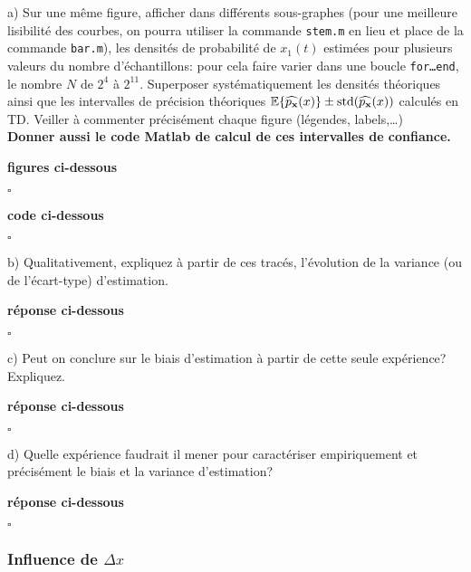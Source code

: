 \documentclass{article}
\newcommand{\debutrep}[1]{\color{blue}\begin{center} \hrulefill \textbf{ #1 } \hrulefill \end{center} }
\newcommand{\finrep}{\vspace*{5mm}\hfill $\square$\color{black}\vspace*{5mm}}
\begin{document}
\begin{list}{}{\setlength{\leftmargin}{6mm} \setlength{\labelwidth}{20mm} \setlength{\labelsep}{2mm} \setlength{\itemsep}{1mm} }

\item[a)] Sur une même figure, afficher dans différents sous-graphes (pour une meilleure lisibilité des courbes, on pourra utiliser la commande {\tt stem.m} en lieu et place de la commande {\tt bar.m}), les densités de probabilité de $x_1(t)$ estimées pour plusieurs valeurs du nombre d'échantillons: pour cela faire varier dans une boucle {\tt for\ldots end}, le nombre $N$ de $2^4$ à $2^{11}$. Superposer systématiquement  les densités théoriques ainsi que les intervalles de précision théoriques $\mathbb{E}\{\widehat{p_{\mathbf{x}}}(x)\} \pm {\rm std}(\widehat{p_{\mathbf{x}}}(x))$ calculés en TD. Veiller à  commenter précisément chaque figure (légendes, labels,\ldots)\\
\textbf{Donner aussi le code Matlab de calcul de ces intervalles de confiance.} 

\debutrep{figures ci-dessous}

\finrep

\debutrep{code ci-dessous}

\finrep

\item[b)] Qualitativement, expliquez à partir de ces tracés, l'évolution de la variance (ou de l'écart-type) d'estimation.

\debutrep{réponse ci-dessous}

\finrep

\item [c)] Peut on conclure sur le biais d'estimation à partir de cette seule expérience? Expliquez.

\debutrep{réponse ci-dessous}

\finrep

\item[d)] Quelle expérience faudrait il mener pour caractériser empiriquement et précisément le biais et la variance d'estimation?

\debutrep{réponse ci-dessous}

\finrep


\end{list}

\subsubsection{Influence de $\Delta x$}
\end{document}
